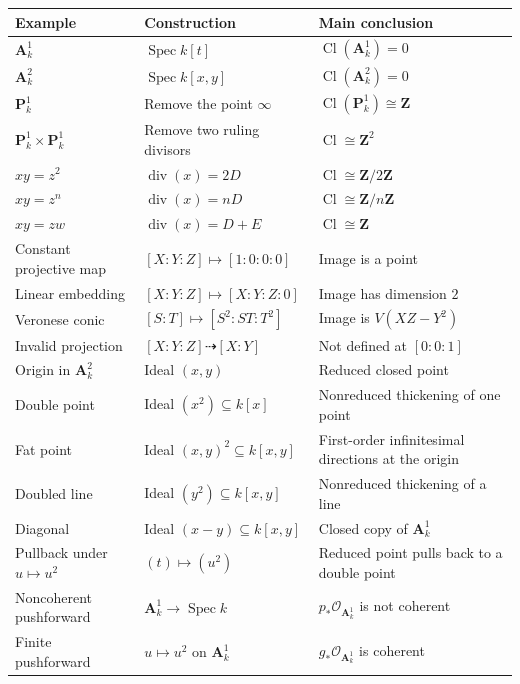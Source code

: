 \renewcommand{\arraystretch}{1.35}
\begin{center}
	\begin{tabular}{|p{3.8cm}|p{5.0cm}|p{4.7cm}|}
		\hline
		\textbf{Example}
		&
		\textbf{Construction}
		&
		\textbf{Main conclusion}
		\\
		\hline
		\(\mathbf A^1_k\)
		&
		\(\operatorname{Spec}k[t]\)
		&
		\(\operatorname{Cl}(\mathbf A^1_k)=0\)
		\\
		\hline
		\(\mathbf A^2_k\)
		&
		\(\operatorname{Spec}k[x,y]\)
		&
		\(\operatorname{Cl}(\mathbf A^2_k)=0\)
		\\
		\hline
		\(\mathbf P^1_k\)
		&
		Remove the point \(\infty\)
		&
		\(\operatorname{Cl}(\mathbf P^1_k)\cong\mathbf Z\)
		\\
		\hline
		\(\mathbf P^1_k\times\mathbf P^1_k\)
		&
		Remove two ruling divisors
		&
		\(\operatorname{Cl}\cong\mathbf Z^2\)
		\\
		\hline
		\(xy=z^2\)
		&
		\(\operatorname{div}(x)=2D\)
		&
		\(\operatorname{Cl}\cong\mathbf Z/2\mathbf Z\)
		\\
		\hline
		\(xy=z^n\)
		&
		\(\operatorname{div}(x)=nD\)
		&
		\(\operatorname{Cl}\cong\mathbf Z/n\mathbf Z\)
		\\
		\hline
		\(xy=zw\)
		&
		\(\operatorname{div}(x)=D+E\)
		&
		\(\operatorname{Cl}\cong\mathbf Z\)
		\\
		\hline
		Constant projective map
		&
		\([X:Y:Z]\mapsto[1:0:0:0]\)
		&
		Image is a point
		\\
		\hline
		Linear embedding
		&
		\([X:Y:Z]\mapsto[X:Y:Z:0]\)
		&
		Image has dimension \(2\)
		\\
		\hline
		Veronese conic
		&
		\([S:T]\mapsto[S^2:ST:T^2]\)
		&
		Image is \(V(XZ-Y^2)\)
		\\
		\hline
		Invalid projection
		&
		\([X:Y:Z]\dashrightarrow[X:Y]\)
		&
		Not defined at \([0:0:1]\)
		\\
		\hline
		Origin in \(\mathbf A^2_k\)
		&
		Ideal \((x,y)\)
		&
		Reduced closed point
		\\
		\hline
		Double point
		&
		Ideal \((x^2)\subseteq k[x]\)
		&
		Nonreduced thickening of one point
		\\
		\hline
		Fat point
		&
		Ideal \((x,y)^2\subseteq k[x,y]\)
		&
		First-order infinitesimal directions at the origin
		\\
		\hline
		Doubled line
		&
		Ideal \((y^2)\subseteq k[x,y]\)
		&
		Nonreduced thickening of a line
		\\
		\hline
		Diagonal
		&
		Ideal \((x-y)\subseteq k[x,y]\)
		&
		Closed copy of \(\mathbf A^1_k\)
		\\
		\hline
		Pullback under \(u\mapsto u^2\)
		&
		\((t)\mapsto(u^2)\)
		&
		Reduced point pulls back to a double point
		\\
		\hline
		Noncoherent pushforward
		&
		\(\mathbf A^1_k\to\operatorname{Spec}k\)
		&
		\(p_*\mathcal O_{\mathbf A^1_k}\) is not coherent
		\\
		\hline
		Finite pushforward
		&
		\(u\mapsto u^2\) on \(\mathbf A^1_k\)
		&
		\(g_*\mathcal O_{\mathbf A^1_k}\) is coherent
		\\
		\hline
	\end{tabular}
\end{center}

